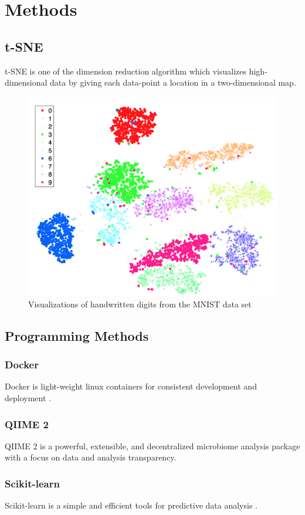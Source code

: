 \documentclass[11pt, a4paper]{article}
\begin{document}
    \section{Methods}
        \subsection{t-SNE}
            t-SNE is one of the dimension reduction algorithm which visualizes high-dimensional data by giving each data-point a location in a two-dimensional map. \cite{tsne1}

            \begin{figure}[htbp]
                \centering
                \includegraphics[width=0.4 \linewidth]{figures/mnist.png}
                \caption{Visualizations of handwritten digits from the MNIST data set \protect \cite{tsne1}}
                \label{fig:mnist}
            \end{figure}

        \subsection{Programming Methods}
            \subsubsection{Docker}
                Docker is light-weight linux containers for consistent development and deployment \cite{docker1}.

            \subsubsection{QIIME 2}
                QIIME 2 is a powerful, extensible, and decentralized microbiome analysis package with a focus on data and analysis transparency.

            \subsubsection{Scikit-learn}
                Scikit-learn is a simple and efficient tools for predictive data analysis \cite{sklearn1, sklearn2}.
\end{document}
